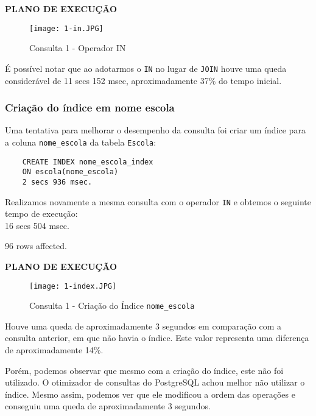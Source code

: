 \documentclass[12pt,a4paper]{article}
\begin{document}
\pagebreak
\begin{flushleft}
\textbf{PLANO DE EXECUÇÃO}\\
\end{flushleft}

\begin{figure}[H]
    \centering
    \texttt{[image: 1-in.JPG]}
    \caption{Consulta 1 - Operador IN}
    \label{fig:diagrama}
\end{figure}

É possível notar que ao adotarmos o \texttt{IN} no lugar de \texttt{JOIN} houve uma queda considerável de 11 secs 152 msec, aproximadamente 37\% do tempo inicial. 
\subsubsection{Criação do índice em nome escola}

Uma tentativa para melhorar o desempenho da consulta foi criar um índice para a coluna \texttt{nome\_escola} da tabela \texttt{Escola}:

\begin{verbatim}
    CREATE INDEX nome_escola_index
    ON escola(nome_escola)
    2 secs 936 msec.
\end{verbatim}

Realizamos novamente a mesma consulta com o operador \texttt{IN} e obtemos o seguinte tempo de execução:\\

16 secs 504 msec.

96 rows affected.\\

\pagebreak
\begin{flushleft}
\textbf{PLANO DE EXECUÇÃO}\\
\end{flushleft}

\begin{figure}[H]
    \centering
    \texttt{[image: 1-index.JPG]}
    \caption{Consulta 1 - Criação do Índice \texttt{nome\_escola}}
    \label{fig:diagrama}
\end{figure}

Houve uma queda de aproximadamente 3 segundos em comparação com a consulta anterior, em que não havia o índice. Este valor representa uma diferença de aproximadamente 14\%.

Porém, podemos observar que mesmo com a criação do índice, este não foi utilizado. O otimizador de consultas do PostgreSQL achou melhor não utilizar o índice. Mesmo assim, podemos ver que ele modificou a ordem das operações e conseguiu uma queda de aproximadamente 3 segundos.
\end{document}
